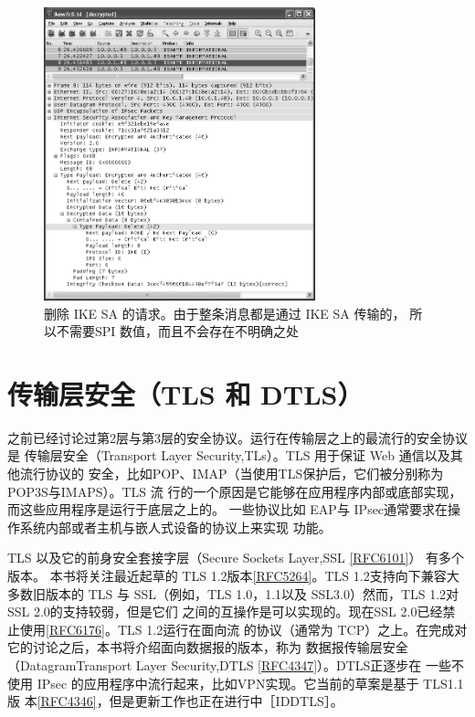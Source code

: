\begin{figure}[!htb]
    \centering
	\includegraphics[width=0.7\textwidth]{imgs/18/18-27.png}
	\caption{删除 IKE SA 的请求。由于整条消息都是通过 IKE SA 传输的，
            所以不需要SPI 数值，而且不会存在不明确之处}
\end{figure}

\section{传输层安全（TLS 和 DTLS）}
之前已经讨论过第2层与第3层的安全协议。运行在传输层之上的最流行的安全协议是
传输层安全（Transport Layer Security,TLs）。TLS 用于保证 Web 通信以及其他流行协议的
安全，比如POP、IMAP（当使用TLS保护后，它们被分别称为POP3S与IMAPS）。TLS 流
行的一个原因是它能够在应用程序内部或底部实现，而这些应用程序是运行于底层之上的。
一些协议比如 EAP与 IPsec通常要求在操作系统内部或者主机与嵌人式设备的协议上来实现
功能。

TLS 以及它的前身安全套接字层（Secure Sockets Layer,SSL \href{https://www.rfc-editor.org/rfc/rfc6101}{[RFC6101]}） 有多个版本。
本书将关注最近起草的 TLS 1.2版本\href{https://www.rfc-editor.org/rfc/rfc5264}{[RFC5264]}。TLS 1.2支持向下兼容大多数旧版本的 TLS
与 SSL（例如，TLS 1.0，1.1以及 SSL3.0）然而，TLS 1.2对SSL 2.0的支持较弱，但是它们
之间的互操作是可以实现的。现在SSL 2.0已经禁止使用\href{https://www.rfc-editor.org/rfc/rfc6176}{[RFC6176]}。TLS 1.2运行在面向流
的协议（通常为 TCP）之上。在完成对它的讨论之后，本书将介绍面向数据报的版本，称为
数据报传输层安全（DatagramTransport Layer Security,DTLS \href{https://www.rfc-editor.org/rfc/rfc4347}{[RFC4347]}）。DTLS正逐步在
一些不使用 IPsec 的应用程序中流行起来，比如VPN实现。它当前的草案是基于 TLS1.1版
本\href{https://www.rfc-editor.org/rfc/rfc4346}{[RFC4346]}，但是更新工作也正在进行中［IDDTLS］。

